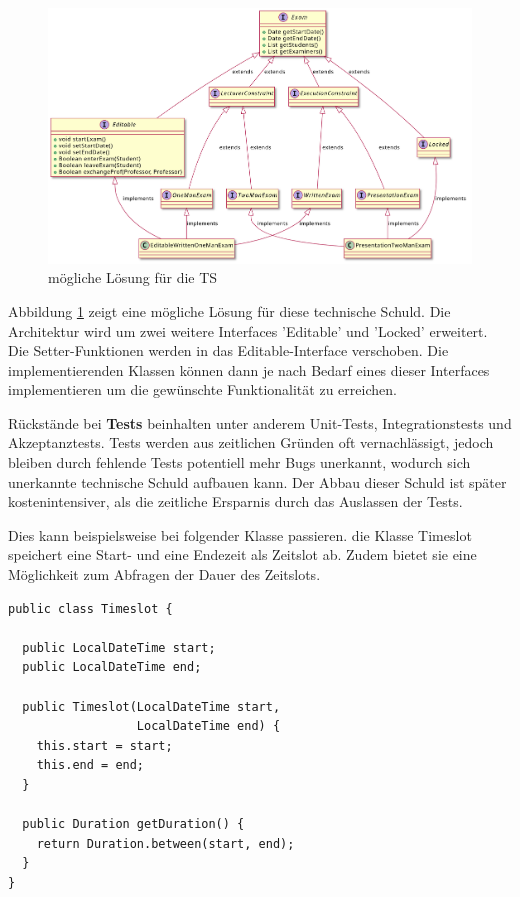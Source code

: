 \documentclass[acmtog]{acmart}
\begin{document}
\begin{figure}[t]
  \centering
  \includegraphics[width=\linewidth]{images/ArchitectureExample02.png}
  \caption{mögliche Lösung für die TS}
  \label{fig:BeispielArchitektur_TS02}
\end{figure}

Abbildung \ref{fig:BeispielArchitektur_TS02} zeigt eine mögliche Lösung für diese 
technische Schuld. Die Architektur wird um zwei weitere Interfaces 'Editable' und 
'Locked' erweitert. Die Setter-Funktionen werden in das Editable-Interface verschoben. 
Die implementierenden Klassen können dann je nach Bedarf eines dieser Interfaces 
implementieren um die gewünschte Funktionalität zu erreichen.


Rückstände bei \textbf{Tests} beinhalten unter anderem Unit-Tests, Integrationstests
und Akzeptanztests. Tests werden aus zeitlichen Gründen oft vernachlässigt,
jedoch bleiben durch fehlende Tests potentiell mehr Bugs unerkannt, wodurch
sich unerkannte technische Schuld aufbauen kann. Der Abbau dieser Schuld ist
später kostenintensiver, als die zeitliche Ersparnis durch das Auslassen der
Tests.

Dies kann beispielsweise bei folgender Klasse passieren. die Klasse Timeslot
speichert eine Start- und eine Endezeit als Zeitslot ab. Zudem bietet sie
eine Möglichkeit zum Abfragen der Dauer des Zeitslots.

\begin{lstlisting}[frame=single,breaklines=true]
public class Timeslot {

  public LocalDateTime start;
  public LocalDateTime end;

  public Timeslot(LocalDateTime start,
                  LocalDateTime end) {
    this.start = start;
    this.end = end;
  }

  public Duration getDuration() {
    return Duration.between(start, end);
  }
}
\end{lstlisting}
\end{document}
